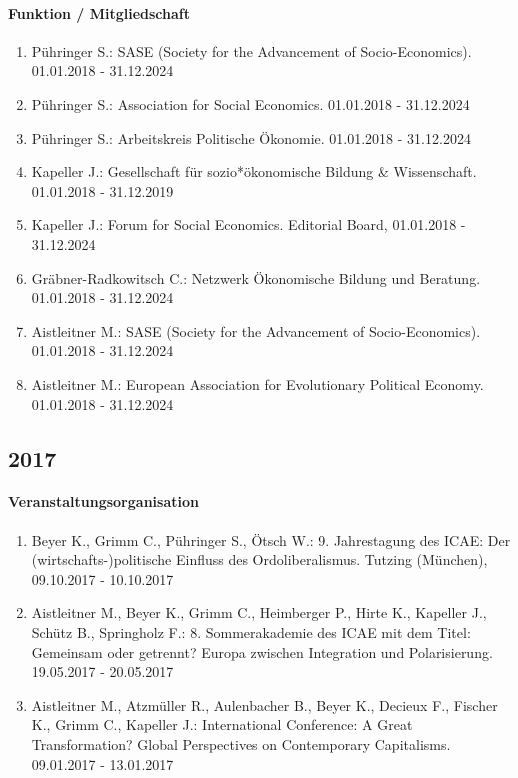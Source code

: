 \paragraph{Funktion / Mitgliedschaft}
\begin{enumerate}[leftmargin=*, labelsep=0.5cm]
\item Pühringer S.: SASE (Society for the Advancement of Socio-Economics). 01.01.2018 - 31.12.2024
\item Pühringer S.: Association for Social Economics. 01.01.2018 - 31.12.2024
\item Pühringer S.: Arbeitskreis Politische Ökonomie. 01.01.2018 - 31.12.2024
\item Kapeller J.: Gesellschaft für sozio*ökonomische Bildung \& Wissenschaft. 01.01.2018 - 31.12.2019
\item Kapeller J.: Forum for Social Economics. Editorial Board, 01.01.2018 - 31.12.2024
\item Gräbner-Radkowitsch C.: Netzwerk Ökonomische Bildung und Beratung. 01.01.2018 - 31.12.2024
\item Aistleitner M.: SASE (Society for the Advancement of Socio-Economics). 01.01.2018 - 31.12.2024
\item Aistleitner M.: European Association for Evolutionary Political Economy. 01.01.2018 - 31.12.2024
\end{enumerate}
\subsection*{2017}
\paragraph{Veranstaltungsorganisation}
\begin{enumerate}[leftmargin=*, labelsep=0.5cm]
\item Beyer K., Grimm C., Pühringer S., Ötsch W.: 9. Jahrestagung des ICAE: Der (wirtschafts-)politische Einfluss des Ordoliberalismus. Tutzing (München), 09.10.2017 - 10.10.2017
\item Aistleitner M., Beyer K., Grimm C., Heimberger P., Hirte K., Kapeller J., Schütz B., Springholz F.: 8. Sommerakademie des ICAE mit dem Titel: Gemeinsam oder getrennt? Europa zwischen Integration und Polarisierung. 19.05.2017 - 20.05.2017
\item Aistleitner M., Atzmüller R., Aulenbacher B., Beyer K., Decieux F., Fischer K., Grimm C., Kapeller J.: International Conference: A Great Transformation? Global Perspectives on Contemporary Capitalisms. 09.01.2017 - 13.01.2017
\end{enumerate}

